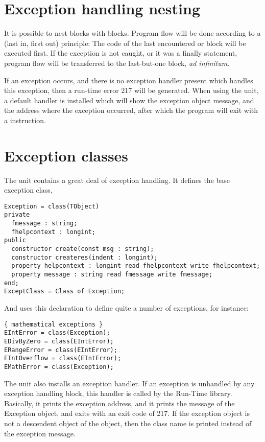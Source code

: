 \section{Exception handling nesting}
It is possible to nest  blocks with 
blocks. Program flow will be done according to a  (last in, first
out) principle: The code of the last encountered  or
  block will be executed first. If the exception is not
caught, or it was a finally statement, program flow will be transferred to
the last-but-one block, {\em ad infinitum}.

If an exception occurs, and there is no exception handler present which
handles this exception, then a run-time error 217 will be generated. 
When using the  unit, a default handler is installed which will show the exception object message, and the
address where the exception occurred, after which the program will exit with
a  instruction. 


\section{Exception classes}
\label{se:exceptclasses}
The  unit contains a great deal of exception handling.
It defines the base exception class, 
\begin{verbatim}
Exception = class(TObject)
private
  fmessage : string;
  fhelpcontext : longint;
public
  constructor create(const msg : string);
  constructor createres(indent : longint);
  property helpcontext : longint read fhelpcontext write fhelpcontext;
  property message : string read fmessage write fmessage;
end;
ExceptClass = Class of Exception;
\end{verbatim}
And uses this declaration to define quite a number of exceptions, for
instance:
\begin{verbatim}
{ mathematical exceptions }
EIntError = class(Exception);
EDivByZero = class(EIntError);
ERangeError = class(EIntError);
EIntOverflow = class(EIntError);
EMathError = class(Exception);
\end{verbatim}
The  unit also installs an exception handler. If an exception is
unhandled by any exception handling block, this handler is called by the
Run-Time library. Basically, it prints the exception address, and it prints
the message of the Exception object, and exits with an exit code of 217.
If the exception object is not a descendent object of the 
object, then the class name is printed instead of the exception message.

